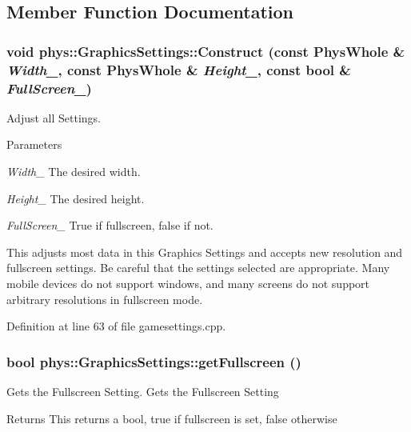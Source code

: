 \subsection{Member Function Documentation}
\hypertarget{classphys_1_1GraphicsSettings_aa8107167a2094f757f409db36e088171}{
\subsubsection[{Construct}]{\setlength{\rightskip}{0pt plus 5cm}void phys::GraphicsSettings::Construct (const PhysWhole \& {\em Width\_\-}, \/  const PhysWhole \& {\em Height\_\-}, \/  const bool \& {\em FullScreen\_\-})}}
\label{dc/df1/classphys_1_1GraphicsSettings_aa8107167a2094f757f409db36e088171}


Adjust all Settings. 
\begin{DoxyParams}{Parameters}
\item[{\em Width\_\-}]The desired width. \item[{\em Height\_\-}]The desired height. \item[{\em FullScreen\_\-}]True if fullscreen, false if not.\end{DoxyParams}
This adjusts most data in this Graphics Settings and accepts new resolution and fullscreen settings. Be careful that the settings selected are appropriate. Many mobile devices do not support windows, and many screens do not support arbitrary resolutions in fullscreen mode. 

Definition at line 63 of file gamesettings.cpp.\hypertarget{classphys_1_1GraphicsSettings_ab158ef7c277f354e71088f3e69c511d0}{
\subsubsection[{getFullscreen}]{\setlength{\rightskip}{0pt plus 5cm}bool phys::GraphicsSettings::getFullscreen ()}}
\label{dc/df1/classphys_1_1GraphicsSettings_ab158ef7c277f354e71088f3e69c511d0}


Gets the Fullscreen Setting. Gets the Fullscreen Setting \begin{DoxyReturn}{Returns}
This returns a bool, true if fullscreen is set, false otherwise 
\end{DoxyReturn}


